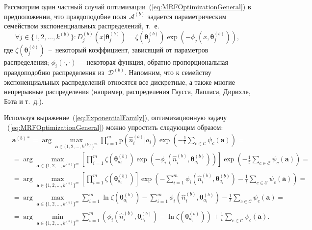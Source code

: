 Рассмотрим один частный случай оптимизации~(\ref{eq:MRFOptimizationGeneral}) в предположении, что правдоподобие поля $\mathcal{A}^{(b)}$ задается параметрическим семейством экспоненциальных распределений, т.~е.
\begin{equation*}
\forall j \in \{1,2,...,k^{(b)}\}: D_j^{(b)} (x \vert \boldsymbol{\theta}_j^{(b)}) = \zeta(\boldsymbol{\theta}_j^{(b)}) \exp\left( -\phi_j(x, \boldsymbol{\theta}_j^{(b)}) \right),
\label{eq:ExponentialFamily}
\end{equation*}
где $\zeta(\boldsymbol{\theta}_j^{(b)})$~--~некоторый коэффициент, зависящий от параметров распределения; $\phi_i(\cdot,\cdot)$~--~некоторая функция, обратно пропорциональная правдоподобию распределения из~$\mathcal{D}^{(b)}$. Напомним, что к семейству экспоненциальных распределений относятся все дискретные, а также многие непрерывные распределения (например, распределения Гаусса, Лапласа, Дирихле, Бэта и т.~д.).

Используя выражение~(\ref{eq:ExponentialFamily}), оптимизационную задачу ~(\ref{eq:MRFOptimizationGeneral}) можно упростить следующим образом:
\begin{equation}
\begin{split}
& \mathbf{a}^{(b)*} = \arg\max_{\mathbf{a} \in \{1,2,\ldots,k^{(b)}\}^m}
\prod\limits_{i=1}^{m} \mathrm{p} (\hat{n}_i^{(b)} \vert a_i) \exp\left(-\frac{1}{t}\sum_{c \in \mathcal{C}} \psi_{c}(\mathbf{a})\right) = \\
& = \arg\max_{\mathbf{a} \in \{1,2,\ldots,k^{(b)}\}^m}
\left[ \prod\limits_{i=1}^{m} \zeta(\boldsymbol{\theta}_{a_i}^{(b)}) \exp\left( -\phi_i(\hat{n}_i^{(b)}, \boldsymbol{\theta}_{a_i}^{(b)}) \right)\right] \exp\left(-\frac{1}{t}\sum\limits_{c \in \mathcal{C}} \psi_{c}(\mathbf{a})\right) = \\
& = \arg\max_{\mathbf{a} \in \{1,2,\ldots,k^{(b)}\}^m}
\left[\prod\limits_{i=1}^{m} \zeta(\boldsymbol{\theta}_{a_i}^{(b)})\right]
\exp\left( -\sum\limits_{i=1}^{m}\phi_i(\hat{n}_i^{(b)}, \boldsymbol{\theta}_{a_i}^{(b)}) -\frac{1}{t} \sum\limits_{c \in \mathcal{C}} \psi_{c}(\mathbf{a}) \right) = \\
& = \arg\max_{\mathbf{a} \in \{1,2,\ldots,k^{(b)}\}^m}
\sum\limits_{i=1}^{m} \ln \zeta(\boldsymbol{\theta}_{a_i}^{(b)}) - \sum\limits_{i=1}^{m}\phi_i(\hat{n}_i^{(b)}, \boldsymbol{\theta}_{a_i}^{(b)}) -\frac{1}{t} \sum\limits_{c \in \mathcal{C}} \psi_{c}(\mathbf{a}) = \\
& = \arg\min_{\mathbf{a} \in \{1,2,\ldots,k^{(b)}\}^m}
\sum\limits_{i=1}^{m} \left(\phi_i(\hat{n}_i^{(b)}, \boldsymbol{\theta}_{a_i}^{(b)}) - \ln\zeta(\boldsymbol{\theta}_{a_i}^{(b)})\right) + \frac{1}{t} \sum\limits_{c \in \mathcal{C}} \psi_{c}(\mathbf{a}).
\end{split}
\label{eq:MRFOptimizationExponential}
\end{equation}

